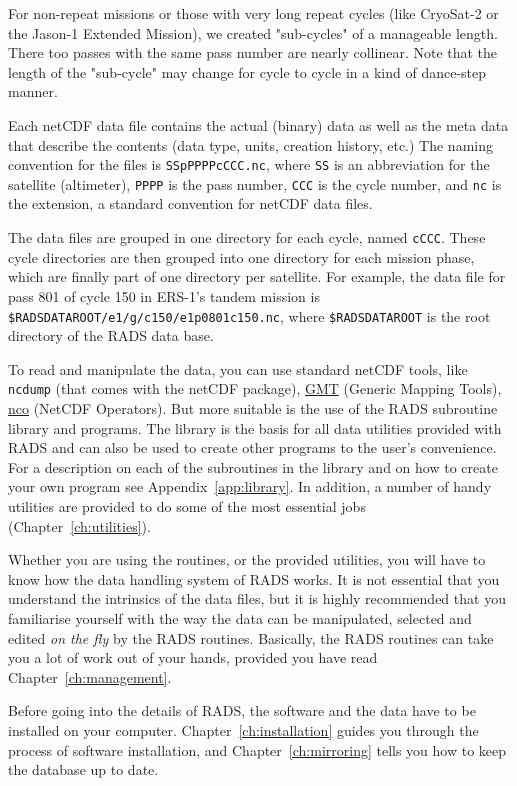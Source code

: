 \documentclass[a4paper,11pt,openany,natbib,nomargin]{thesis}
\makeatletter
\newcommand\prog[1]{\url{#1}\index{programs!#1@\protect\url{#1}}}
\makeatother
\begin{document}
For non-repeat missions or those with very long repeat cycles (like CryoSat-2 or the Jason-1 Extended Mission), we created "sub-cycles" of a manageable length. There too passes with the same pass number are nearly collinear. Note that the length of the "sub-cycle" may change for cycle to cycle in a kind of dance-step manner.

Each netCDF data file contains the actual (binary) data as well as the meta data that describe the contents (data type, units, creation history, etc.) The naming convention for the files is \verb|SSpPPPPcCCC.nc|, where \verb|SS| is an abbreviation for the satellite (altimeter), \verb|PPPP| is the pass number, \verb|CCC| is the cycle number, and \verb|nc| is the extension, a standard convention for netCDF data files.

The data files are grouped in one directory for each cycle, named \verb|cCCC|. These cycle directories are then grouped into one directory for each mission phase, which are finally part of one directory per satellite. For example, the data file for pass 801 of cycle 150 in ERS-1's tandem mission is \verb|$RADSDATAROOT/e1/g/c150/e1p0801c150.nc|, where \verb|$RADSDATAROOT| is the root directory of the RADS data base.

To read and manipulate the data, you can use standard netCDF tools, like \verb|ncdump| (that comes with the netCDF package), \prog{GMT} (Generic Mapping Tools), \prog{nco} (NetCDF Operators). But more suitable is the use of the RADS subroutine library and programs. The library is the basis for all data utilities provided with RADS and can also be used to create other programs to the user's convenience. For a description on each of the subroutines in the library and on how to create your own program see Appendix~\ref{app:library}. In addition, a number of handy utilities are provided to do some of the most essential jobs (Chapter~\ref{ch:utilities}).

Whether you are using the routines, or the provided utilities, you will have to know how the data handling system of RADS works. It is not essential that you understand the intrinsics of the data files, but it is highly recommended that you familiarise yourself with the way the data can be manipulated, selected and edited \emph{on the fly} by the RADS routines. Basically, the RADS routines can take you a lot of work out of your hands, provided you have read Chapter~\ref{ch:management}.

Before going into the details of RADS, the software and the data have to be installed on your computer. Chapter~\ref{ch:installation} guides you through the process of software installation, and Chapter~\ref{ch:mirroring} tells you how to keep the database up to date.
\end{document}
